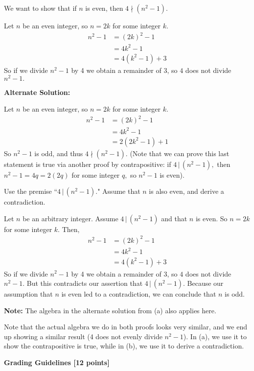 \documentclass[12pt]{exam}
\begin{document}
\begin{solution}
\begin{qparts}
\item We want to show that if $n$ is even, then $4\nmid (n^2-1).$

Let $n$ be an even integer, so $n = 2k$ for some integer $k.$
\begin{align*}
    n^2 - 1 &= (2k)^2 - 1 \\
    &= 4k^2 - 1\\
    &= 4(k^2 - 1) + 3
\end{align*}
So if we divide $n^2-1$ by 4 we obtain a remainder of 3, so $4$ does not divide $n^2-1.$

\textbf{Alternate Solution:}

Let $n$ be an even integer, so $n=2k$ for some integer $k.$
\begin{align*}
    n^2-1 &= (2k)^2 - 1 \\
    &= 4k^2 - 1 \\
    &= 2(2k^2-1) + 1
\end{align*}
So $n^2-1$ is odd, and thus $4\nmid (n^2-1).$ (Note that we can prove this last statement is true via another proof by contrapositive: if $4\,|\,(n^2-1),$ then $n^2-1=4q=2(2q)$ for some integer $q,$ so $n^2-1$ is even).

\item Use the premise  ``$4\,|\,(n^2-1).$" Assume that  $n$ is also even, and derive a contradiction.

Let $n$ be an arbitrary integer. Assume $4\,|\,(n^2-1)$ and that $n$ is even. So $n = 2k$ for some integer $k.$ Then,
\begin{align*}
    n^2 - 1 &= (2k)^2 - 1 \\
    &= 4k^2 - 1\\
    &= 4(k^2 - 1) + 3
\end{align*}
So if we divide $n^2-1$ by 4 we obtain a remainder of 3, so $4$ does not divide $n^2-1.$ But this contradicts our assertion that $4\,|\,(n^2-1).$ Because our assumption that $n$ is even led to a contradiction, we can conclude that $n$ is odd.

\textbf{Note:} The algebra in the alternate solution from (a) also applies here.

\item Note that the actual algebra we do in both proofs looks very similar, and we end up showing a similar result (4 does not evenly divide $n^2-1$). In (a), we use it to show the contrapositive is true, while in (b), we use it to derive a contradiction.
\end{qparts}
\textbf{Grading Guidelines [12 points]}


\end{solution}
\end{document}
